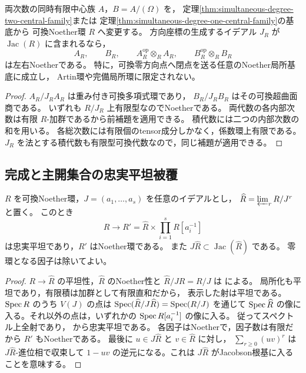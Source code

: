 \begin{corollary}\label{cor:simultaneous-local-noether}
両次数の同時有限中心族 $A$，$B=A/(\Omega)$ を，
定理\ref{thm:simultaneous-degree-two-central-family}または
定理\ref{thm:simultaneous-degree-one-central-family}の基底から
可換Noether環 $R$ へ変更する。
方向座標の生成するイデアル $J_R$ が $\operatorname{Jac}(R)$ に含まれるなら，
\[
 A_R,\qquad B_R,\qquad
 A_R^{\mathrm{op}}\otimes_R A_R,\qquad
 B_R^{\mathrm{op}}\otimes_R B_R
\]
は左右Noetherである。
特に，可換零方向点へ閉点を送る任意のNoether局所基底に成立し，
Artin環や完備局所環に限定されない。
\end{corollary}
\begin{proof}
$A_R/J_RA_R$ は重み付き可換多項式環であり，
$B_R/J_RB_R$ はその可換超曲面商である。
いずれも $R/J_R$ 上有限型なのでNoetherである。
両代数の各内部次数は有限 $R$-加群であるから前補題を適用できる。
積代数には二つの内部次数の和を用いる。
各総次数には有限個のtensor成分しかなく，係数環上有限である。
$J_R$ を法とする積代数も有限型可換代数なので，同じ補題が適用できる。
\end{proof}

\subsection{完成と主開集合の忠実平坦被覆}

\begin{lemma}\label{lem:completion-punctured-flat-cover}
$R$ を可換Noether環，$J=(a_1,\ldots,a_s)$ を任意のイデアルとし，
$\widehat R=\varprojlim_r R/J^r$ と置く。
このとき
\begin{equation}\label{eq:completion-punctured-flat-cover}
 R\longrightarrow R'=
     \widehat R\times\prod_{i=1}^s R[a_i^{-1}]
\end{equation}
は忠実平坦であり，$R'$ はNoether環である。
また $J\widehat R\subset\operatorname{Jac}(\widehat R)$ である。
零環となる因子は除いてよい。
\end{lemma}
\begin{proof}
$R\to\widehat R$ の平坦性，$\widehat R$ のNoether性と
$\widehat R/J\widehat R=R/J$ は
\cite[Tags~00MB, 031C, 05GH]{StacksProject}による。
局所化も平坦であり，有限積は加群として有限直和だから，
表示した射は平坦である。$\operatorname{Spec} R$ のうち $V(J)$ の点は
$\operatorname{Spec}(\widehat R/J\widehat R)=\operatorname{Spec}(R/J)$ を通じて
$\operatorname{Spec}\widehat R$ の像に入る。それ以外の点は，いずれかの
$\operatorname{Spec} R[a_i^{-1}]$ の像に入る。
従ってスペクトル上全射であり，
\cite[Tag~00HQ, Lemma~10.39.16]{StacksProject}から忠実平坦である。
各因子はNoetherで，因子数は有限だから $R'$ もNoetherである。
最後に $u\in J\widehat R$ と $v\in\widehat R$ に対し，
$\sum_{r\ge0}(uv)^r$ は $J\widehat R$-進位相で収束して
$1-uv$ の逆元になる。これは $J\widehat R$ がJacobson根基に入ることを意味する。
\end{proof}

